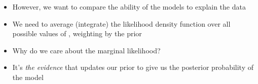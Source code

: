 \begin{frame}
    \begin{itemize}
        \item<1-> However, we want to compare the ability of the models to explain the
            data
        \item<2-> We need to average (integrate) the likelihood density function
            over all possible values of \probheads, weighting by the prior
    \end{itemize}

\end{frame}


\begin{frame}
    \begin{itemize}
        \item<1-> Why do we care about the marginal likelihood?
        \item<2-> It's \emph{the evidence} that updates our prior to give us
            the posterior probability of the model
    \end{itemize}

\end{frame}
